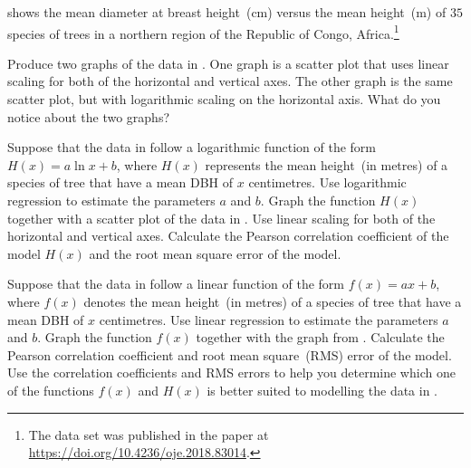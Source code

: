 \documentclass[a4paper,oneside,12pt]{article}
\begin{document}
\begin{exercise}
 shows the mean diameter at breast
height~(cm) versus the mean height~(m) of $35$ species of trees in a
northern region of the Republic of Congo, Africa.\footnote{
  The data set was published in the paper at
  \url{https://doi.org/10.4236/oje.2018.83014}.
}
\begin{packedenum}
\item\label{subex:logarithm:Sombo_graph_linear_log}
  Produce two graphs of the data in .  One
  graph is a scatter plot that uses linear scaling for both of the
  horizontal and vertical axes.  The other graph is the same scatter
  plot, but with logarithmic scaling on the horizontal axis.  What do
  you notice about the two graphs?

\item\label{subex:logarithm:Sombo_log_regression}
  Suppose that the data in  follow a
  logarithmic function of the form $H(x) = a \ln x + b$, where $H(x)$
  represents the mean height~(in metres) of a species of tree that
  have a mean DBH of $x$ centimetres.  Use logarithmic regression to
  estimate the parameters $a$ and $b$.  Graph the function $H(x)$
  together with a scatter plot of the data in
  .  Use linear scaling for both of the
  horizontal and vertical axes.  Calculate the Pearson correlation
  coefficient of the model $H(x)$ and the root mean square error of
  the model.

\item\label{subex:logarithm:Sombo_linear_regression}
  Suppose that the data in  follow a
  linear function of the form $f(x) = ax + b$, where $f(x)$ denotes
  the mean height~(in metres) of a species of tree that have a mean
  DBH of $x$ centimetres.  Use linear regression to estimate the
  parameters $a$ and $b$.  Graph the function $f(x)$ together with the
  graph from .  Calculate
  the Pearson correlation coefficient and root mean square~(RMS) error
  of the model.  Use the correlation coefficients and RMS errors to
  help you determine which one of the functions $f(x)$ and $H(x)$ is
  better suited to modelling the data in .
\end{packedenum}
\end{exercise}
\end{document}
